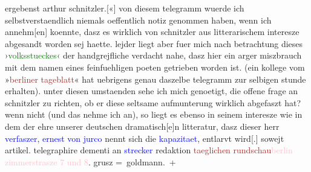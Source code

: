                ergebenst arthur schnitzler.{[}«{]} von diesem telegramm wuerde ich
               selbstverstaendlich niemals oeffentlich notiz genommen haben, wenn ich
                  annehm{[}en{]} koennte, dasz es wirklich von schnitzler aus {\pb}litterarischem interesze abgesandt worden sej haette.
               lejder liegt aber fuer mich nach betrachtung dieses ›\textcolor{green}{volksstueckes}{}‹ der handgrejfliche verdacht
               nahe, dasz hier ein arger miszbrauch mit dem namen eines feinfuehligen poeten
               getrieben worden ist. (ein kollege vom »\textcolor{brown}{berliner
                  tageblatt}{}\ledrightnote{\textcolor{brown}{Berliner Tageblatt}}« hat uebrigens genau daszelbe telegramm zur selbigen
                  stunde erhalten). unter diesen umstaenden sehe ich mich genoetigt,
               die offene frage an schnitzler zu richten, ob er diese seltsame aufmunterung wirklich
               abgefaszt hat? wenn nicht (und das nehme ich an), so liegt es ebenso in seinem
               interesze wie in dem der ehre unserer deutschen dramatisch{[}e{]}n
               litteratur, dasz dieser herr \textcolor{blue}{verfaszer}{}, \textcolor{blue}{ernest von jurco}{}\ledrightnote{\textcolor{blue}{Ernest von Gréger-Jurco}} nennt sich
               die \textcolor{blue}{kapazitaet}{}, entlarvt
                  wird{[}.{]} sowejt artikel. telegraphire dementi an \textcolor{blue}{strecker}{}\ledrightnote{\textcolor{blue}{Karl Strecker}} redaktion \textcolor{brown}{taeglichen rundschau}{}\ledrightnote{\textcolor{brown}{Tägliche Rundschau}}{ }\textcolor{pink}{berlin zimmerstrasze 7 und 8}{}\ledrightnote{\textcolor{pink}{Zimmerstraße}}. grusz \spacefill\mbox{=
                  goldmann. +}\pend
           \endnumbering{}  
      